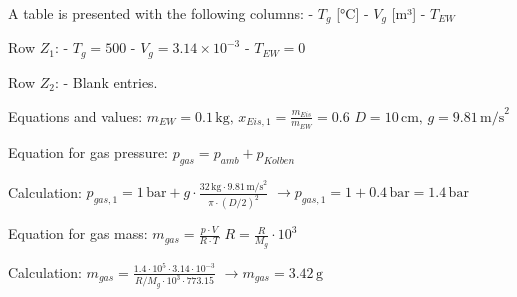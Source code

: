 A table is presented with the following columns:  
- \( T_g \) [°C]  
- \( V_g \) [m³]  
- \( T_{EW} \)  

Row \( Z_1 \):  
- \( T_g = 500 \)  
- \( V_g = 3.14 \times 10^{-3} \)  
- \( T_{EW} = 0 \)  

Row \( Z_2 \):  
- Blank entries.  

Equations and values:  
\( m_{EW} = 0.1 \, \text{kg}, \, x_{Eis,1} = \frac{m_{Eis}}{m_{EW}} = 0.6 \)  
\( D = 10 \, \text{cm}, \, g = 9.81 \, \text{m/s}^2 \)  

Equation for gas pressure:  
\( p_{gas} = p_{amb} + p_{Kolben} \)  

Calculation:  
\( p_{gas,1} = 1 \, \text{bar} + g \cdot \frac{32 \, \text{kg} \cdot 9.81 \, \text{m/s}^2}{\pi \cdot (D/2)^2} \)  
\( \rightarrow p_{gas,1} = 1 + 0.4 \, \text{bar} = 1.4 \, \text{bar} \)  

Equation for gas mass:  
\( m_{gas} = \frac{p \cdot V}{R \cdot T} \)  
\( R = \frac{R}{M_g} \cdot 10^3 \)  

Calculation:  
\( m_{gas} = \frac{1.4 \cdot 10^5 \cdot 3.14 \cdot 10^{-3}}{R/M_g \cdot 10^3 \cdot 773.15} \)  
\( \rightarrow m_{gas} = 3.42 \, \text{g} \)